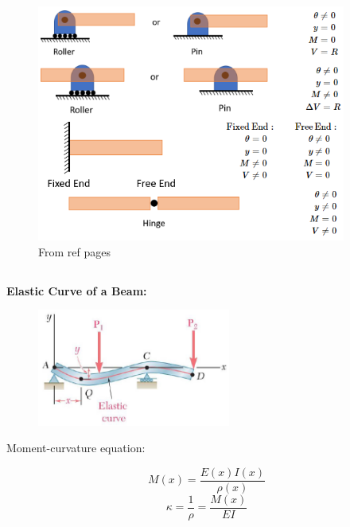 \begin{figure}[!h]
\centering
\includegraphics[angle=0, width=4in]{Beam Deflection-Figures/BoundryConditions.png}
\vspace{-2mm}
\caption{\small From ref pages}
\vspace{-3mm}
\label{Fig:Boundaries}
\end{figure}


\subsection{}

\noindent \textbf{Elastic Curve of a Beam:} 

\begin{figure}[!h]
\centering
\includegraphics[angle=0, width=2.5in]{Beam Deflection-Figures/ElasticCurveBeam.png}
\vspace{-2mm}
\caption{\small {}}
\vspace{-3mm}
\label{Fig:ElasticCurveBeam}
\end{figure}

\noindent Moment-curvature equation:
 
\[M(x) = \frac{E(x)I(x)}{\rho(x)}\]
\[\kappa = \frac{1}{\rho} = \frac{M(x)}{EI}\]

